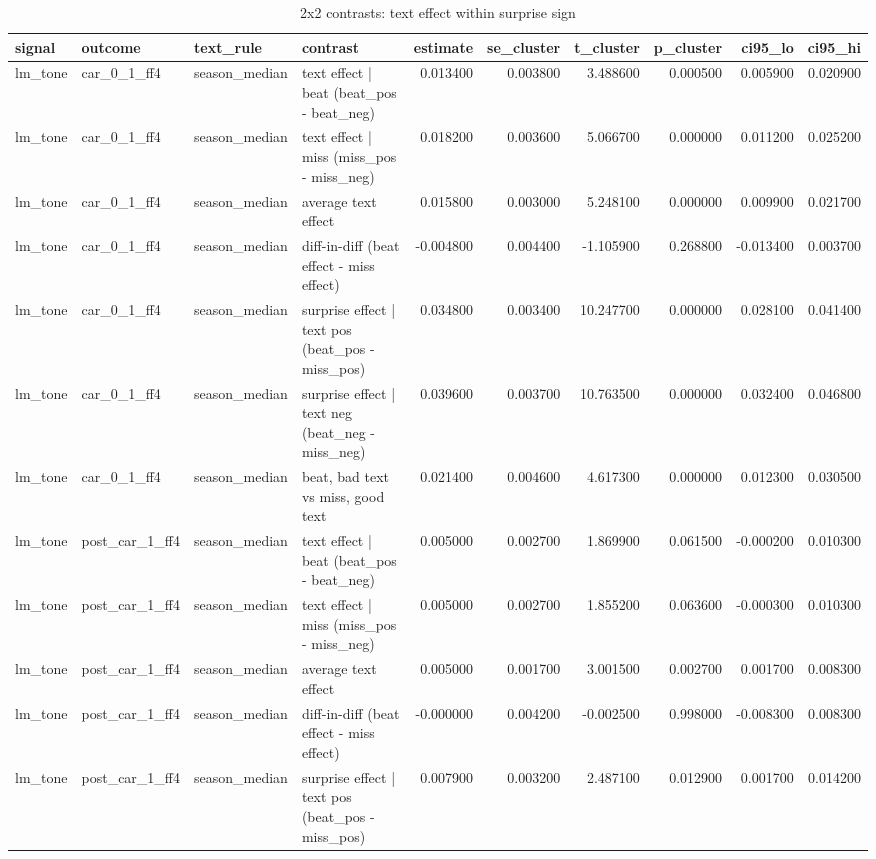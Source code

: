 \begin{table}
\caption{2x2 contrasts: text effect within surprise sign}
\label{tab:t8_2x2_contrasts__validation}
\begin{tabular}{llllrrrrrr}
\toprule
signal & outcome & text\_rule & contrast & estimate & se\_cluster & t\_cluster & p\_cluster & ci95\_lo & ci95\_hi \\
\midrule
lm\_tone & car\_0\_1\_ff4 & season\_median & text effect | beat  (beat\_pos - beat\_neg) & 0.013400 & 0.003800 & 3.488600 & 0.000500 & 0.005900 & 0.020900 \\
lm\_tone & car\_0\_1\_ff4 & season\_median & text effect | miss  (miss\_pos - miss\_neg) & 0.018200 & 0.003600 & 5.066700 & 0.000000 & 0.011200 & 0.025200 \\
lm\_tone & car\_0\_1\_ff4 & season\_median & average text effect & 0.015800 & 0.003000 & 5.248100 & 0.000000 & 0.009900 & 0.021700 \\
lm\_tone & car\_0\_1\_ff4 & season\_median & diff-in-diff (beat effect - miss effect) & -0.004800 & 0.004400 & -1.105900 & 0.268800 & -0.013400 & 0.003700 \\
lm\_tone & car\_0\_1\_ff4 & season\_median & surprise effect | text pos (beat\_pos - miss\_pos) & 0.034800 & 0.003400 & 10.247700 & 0.000000 & 0.028100 & 0.041400 \\
lm\_tone & car\_0\_1\_ff4 & season\_median & surprise effect | text neg (beat\_neg - miss\_neg) & 0.039600 & 0.003700 & 10.763500 & 0.000000 & 0.032400 & 0.046800 \\
lm\_tone & car\_0\_1\_ff4 & season\_median & beat, bad text vs miss, good text & 0.021400 & 0.004600 & 4.617300 & 0.000000 & 0.012300 & 0.030500 \\
lm\_tone & post\_car\_1\_ff4 & season\_median & text effect | beat  (beat\_pos - beat\_neg) & 0.005000 & 0.002700 & 1.869900 & 0.061500 & -0.000200 & 0.010300 \\
lm\_tone & post\_car\_1\_ff4 & season\_median & text effect | miss  (miss\_pos - miss\_neg) & 0.005000 & 0.002700 & 1.855200 & 0.063600 & -0.000300 & 0.010300 \\
lm\_tone & post\_car\_1\_ff4 & season\_median & average text effect & 0.005000 & 0.001700 & 3.001500 & 0.002700 & 0.001700 & 0.008300 \\
lm\_tone & post\_car\_1\_ff4 & season\_median & diff-in-diff (beat effect - miss effect) & -0.000000 & 0.004200 & -0.002500 & 0.998000 & -0.008300 & 0.008300 \\
lm\_tone & post\_car\_1\_ff4 & season\_median & surprise effect | text pos (beat\_pos - miss\_pos) & 0.007900 & 0.003200 & 2.487100 & 0.012900 & 0.001700 & 0.014200 \\

\end{tabular}
\end{table}
